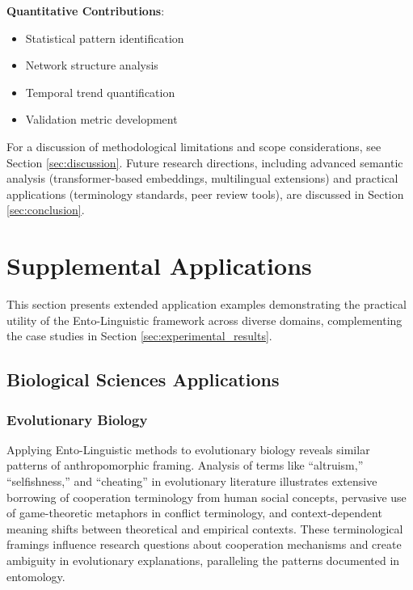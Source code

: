 \documentclass[
]{article}
\providecommand{\tightlist}{%
  \setlength{\itemsep}{0pt}\setlength{\parskip}{0pt}}
\numberwithin{equation}{section}
\begin{document}
\textbf{Quantitative Contributions}:

\begin{itemize}
\tightlist
\item
  Statistical pattern identification
\item
  Network structure analysis
\item
  Temporal trend quantification
\item
  Validation metric development
\end{itemize}

For a discussion of methodological limitations and scope considerations,
see Section \ref{sec:discussion}. Future research directions, including
advanced semantic analysis (transformer-based embeddings, multilingual
extensions) and practical applications (terminology standards, peer
review tools), are discussed in Section \ref{sec:conclusion}.

\newpage

\section{Supplemental Applications}\label{sec:supplemental_applications}

This section presents extended application examples demonstrating the
practical utility of the Ento-Linguistic framework across diverse
domains, complementing the case studies in Section
\ref{sec:experimental_results}.

\subsection{Biological Sciences
Applications}\label{biological-sciences-applications}

\subsubsection{Evolutionary Biology}\label{evolutionary-biology}

Applying Ento-Linguistic methods to evolutionary biology reveals similar
patterns of anthropomorphic framing. Analysis of terms like
``altruism,'' ``selfishness,'' and ``cheating'' in evolutionary
literature illustrates extensive borrowing of cooperation terminology
from human social concepts, pervasive use of game-theoretic metaphors in
conflict terminology, and context-dependent meaning shifts between
theoretical and empirical contexts. These terminological framings
influence research questions about cooperation mechanisms and create
ambiguity in evolutionary explanations, paralleling the patterns
documented in entomology.
\end{document}
